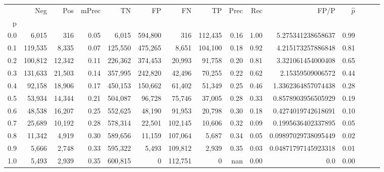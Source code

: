 \begin{tabular}{rrrrrrrrrrrrrrr}
\toprule
{} &      Neg &     Pos & mPrec &       TN &       FP &       FN &       TP &  Prec &   Rec &                 FP/P & $\hat{p}$ \\
p   &          &         &       &          &          &          &          &       &       &                      &           \\
\midrule
0.0 &    6,015 &     316 &  0.05 &    6,015 &  594,800 &      316 &  112,435 &  0.16 &  1.00 &    5.275341238658637 &      0.99 \\
0.1 &  119,535 &   8,335 &  0.07 &  125,550 &  475,265 &    8,651 &  104,100 &  0.18 &  0.92 &    4.215173257886848 &      0.81 \\
0.2 &  100,812 &  12,342 &  0.11 &  226,362 &  374,453 &   20,993 &   91,758 &  0.20 &  0.81 &    3.321061454000408 &      0.65 \\
0.3 &  131,633 &  21,503 &  0.14 &  357,995 &  242,820 &   42,496 &   70,255 &  0.22 &  0.62 &     2.15359509006572 &      0.44 \\
0.4 &   92,158 &  18,906 &  0.17 &  450,153 &  150,662 &   61,402 &   51,349 &  0.25 &  0.46 &   1.3362364857074438 &      0.28 \\
0.5 &   53,934 &  14,344 &  0.21 &  504,087 &   96,728 &   75,746 &   37,005 &  0.28 &  0.33 &   0.8578903956505929 &      0.19 \\
0.6 &   48,538 &  16,207 &  0.25 &  552,625 &   48,190 &   91,953 &   20,798 &  0.30 &  0.18 &   0.4274019742618691 &      0.10 \\
0.7 &   25,689 &  10,192 &  0.28 &  578,314 &   22,501 &  102,145 &   10,606 &  0.32 &  0.09 &   0.1995636402337895 &      0.05 \\
0.8 &   11,342 &   4,919 &  0.30 &  589,656 &   11,159 &  107,064 &    5,687 &  0.34 &  0.05 &  0.09897029738095449 &      0.02 \\
0.9 &    5,666 &   2,748 &  0.33 &  595,322 &    5,493 &  109,812 &    2,939 &  0.35 &  0.03 &  0.04871797145923318 &      0.01 \\
1.0 &    5,493 &   2,939 &  0.35 &  600,815 &        0 &  112,751 &        0 &   nan &  0.00 &                  0.0 &      0.00 \\
\bottomrule
\end{tabular}
